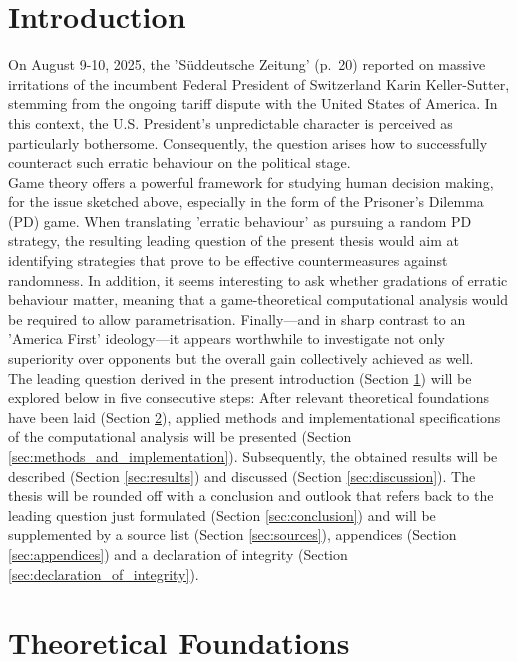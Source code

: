 \documentclass[11pt]{article}
\begin{document}
\section{Introduction} \label{sec:intro}
On August 9-10, 2025, the 'Süddeutsche Zeitung' (p.~20) reported on massive irritations of the incumbent Federal President of Switzerland Karin Keller-Sutter, stemming from the ongoing tariff dispute with the United States of America.
In this context, the U.S. President's unpredictable character is perceived as particularly bothersome.
Consequently, the question arises how to successfully counteract such erratic behaviour on the political stage.\\
\indent Game theory offers a powerful framework for studying human decision making, for the issue sketched above, especially in the form of the Prisoner's Dilemma (PD) game.
When translating 'erratic behaviour' as pursuing a random PD strategy, the resulting leading question of the present thesis would aim at identifying strategies that prove to be effective countermeasures against randomness.
In addition, it seems interesting to ask whether gradations of erratic behaviour matter, meaning that a game-theoretical computational analysis would be required to allow parametrisation.
Finally---and in sharp contrast to an 'America First' ideology---it appears worthwhile to investigate not only superiority over opponents but the overall gain collectively achieved as well.\\
\indent The leading question derived in the present introduction (Section \ref{sec:intro}) will be explored below in five consecutive steps: After relevant theoretical foundations have been laid (Section \ref{sec:theoretical_found}), applied methods and implementational specifications of the computational analysis will be presented (Section \ref{sec:methods_and_implementation}).
Subsequently, the obtained results will be described (Section \ref{sec:results}) and discussed (Section \ref{sec:discussion}). 
The thesis will be rounded off with a conclusion and outlook that refers back to the leading question just formulated (Section \ref{sec:conclusion}) and will be supplemented by a source list (Section \ref{sec:sources}), appendices (Section \ref{sec:appendices}) and a declaration of integrity (Section \ref{sec:declaration_of_integrity}).

\section{Theoretical Foundations} \label{sec:theoretical_found}
\end{document}
